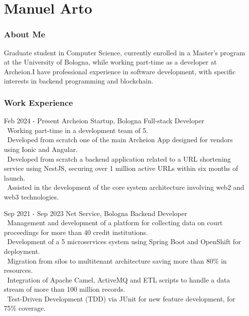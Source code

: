 \documentclass{tccv}
\begin{document}
\part{Manuel Arto}

\section{About Me}

Graduate student in Computer Science, currently enrolled in a Master's program at the University of Bologna, while working part-time as a developer at Archeion.\newline I have professional experience in software development, with specific interests in backend programming and blockchain.

\section{Work Experience}

\begin{eventlist}

     \item{Feb 2024 - Present}
     {Archeion Startup, Bologna}
     {Full-stack Developer} \\
     \textbullet~Working part-time in a development team of 5. \\
     \textbullet~Developed from scratch one of the main Archeion App designed for vendors using Ionic and Angular. \\
     \textbullet~Developed from scratch a backend application related to a URL shortening service using NestJS, securing over 1 million active URLs within six months of launch. \\
     \textbullet~Assisted in the development of the core system architecture involving web2 and web3 technologies.

     \item{Sep 2021 - Sep 2023}
     {Net Service, Bologna}
     {Backend Developer} \\
     \textbullet~Management and development of a platform for collecting data on court proceedings for more than 40 credit institutions. \\
     \textbullet~Development of a 5 microservices system using Spring Boot and OpenShift for deployment. \\
     \textbullet~Migration from silos to multitenant architecture saving more than 80\% in resources. \\
     \textbullet~Integration of Apache Camel, ActiveMQ and ETL scripts to handle a data stream of more than 100 million records. \\
     \textbullet~Test-Driven Development (TDD) via JUnit for new feature development, for 75\% coverage.

\end{eventlist}
\end{document}
